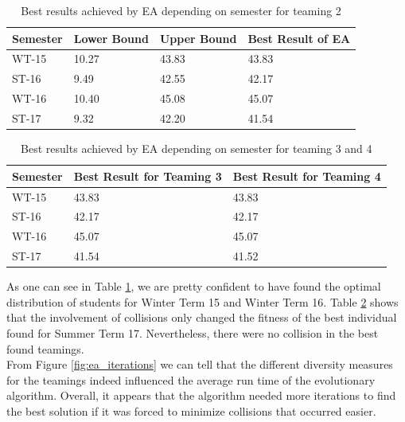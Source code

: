 \documentclass[12pt,a4paper]{article}
\begin{document}
 \begin{center}
\begin{table}[]
\centering
\caption{Best results achieved by EA depending on semester for teaming 2}
\label{results_teaming2}
\begin{tabular}{l|l|l|l}
Semester & Lower Bound & Upper Bound & Best Result of EA \\ \hline
WT-15    & 10.27       & 43.83       & 43.83             \\ \hline
ST-16    & 9.49        & 42.55       & 42.17             \\ \hline
WT-16    & 10.40       & 45.08       & 45.07             \\ \hline
ST-17    & 9.32        & 42.20       & 41.54             \\
\end{tabular}
\end{table}
 \end{center}
 
\begin{center}
 \begin{table}[]
\centering
\caption{Best results achieved by EA depending on semester for teaming 3 and 4}
\label{results_teaming3_4}
\begin{tabular}{l|l|l}
\hline
Semester & Best Result for Teaming 3 & Best Result for Teaming 4 \\ \hline
WT-15    & 43.83                     & 43.83                     \\ \hline
ST-16    & 42.17                     & 42.17                     \\ \hline
WT-16    & 45.07                     & 45.07                     \\ \hline
ST-17    & 41.54                     & 41.52                     \\
\end{tabular}
\end{table}
\end{center}

As one can see in Table \ref{results_teaming2}, we are pretty confident to have found the optimal distribution of students for Winter Term 15 and Winter Term 16. Table \ref{results_teaming3_4} shows that the involvement of collisions only changed the fitness of the best individual found for Summer Term 17. Nevertheless, there were no collision in the best found teamings.\\
 
 From Figure \ref{fig:ea_iterations} we can tell that the different diversity measures for the teamings indeed influenced the average run time of the evolutionary algorithm. Overall, it appears that the algorithm needed more iterations to find the best solution if it was forced to minimize collisions that occurred easier. 
 
\end{document}
